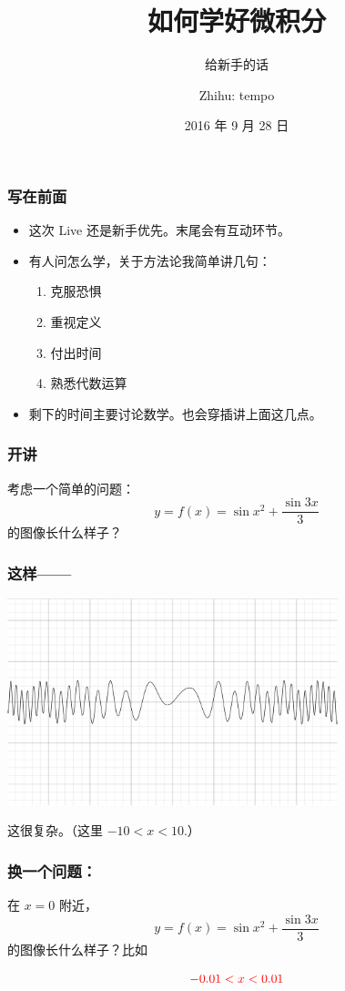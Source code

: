 \documentclass[CJK]{beamer}
\title{如何学好微积分}
\subtitle{给新手的话}
\author{Zhihu: tempo}
\date{2016 年 9 月 28 日}
\begin{document}
\begin{frame}
\titlepage
\end{frame}

\begin{frame}
\frametitle{写在前面}
\begin{itemize}
	\setlength\itemsep{2.5em}
	\item 这次 Live 还是新手优先。末尾会有互动环节。
	\item 有人问怎么学，关于方法论我简单讲几句：
	\begin{enumerate}
	\setlength\itemsep{0.5em}
	\item 克服恐惧
	\item 重视定义
	\item \alert{付出时间}
	\item 熟悉代数运算
    \end{enumerate}
    \item 剩下的时间主要讨论数学。也会穿插讲上面这几点。

\end{itemize}
\end{frame}

\begin{frame}
\frametitle{开讲}
考虑一个简单的问题：
$$ y = f(x) = \sin x^2 + \dfrac{\sin 3x}{3} $$
的图像长什么样子？
\end{frame}

\begin{frame}
\frametitle{这样——}
\begin{center}
\includegraphics[height=6cm]{graph1.jpeg}
\end{center}
这很\alert{复杂}。（这里 $-10 < x < 10$.）
\end{frame}

\begin{frame}
\frametitle{换一个问题：}
在 $x = 0$ 附近，
$$ y = f(x) = \sin x^2 + \dfrac{\sin 3x}{3}$$
的图像长什么样子？比如

$$\textcolor{red}{-0.01 < x < 0.01}$$
\end{frame}
\end{document}
